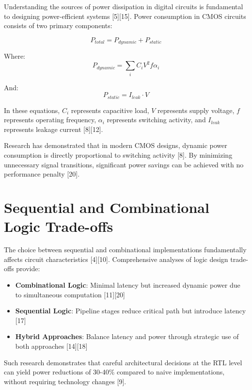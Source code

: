\documentclass[15pt,a4paper]{report}
\begin{document}
Understanding the sources of power dissipation in digital circuits is fundamental to designing power-efficient systems [5][15]. Power consumption in CMOS circuits consists of two primary components:

\begin{equation}
P_{total} = P_{dynamic} + P_{static}
\end{equation}

Where:
\begin{equation}
P_{dynamic} = \sum_{i} C_i V^2 f \alpha_i
\end{equation}

And:
\begin{equation}
P_{static} = I_{leak} \cdot V
\end{equation}

In these equations, $C_i$ represents capacitive load, $V$ represents supply voltage, $f$ represents operating frequency, $\alpha_i$ represents switching activity, and $I_{leak}$ represents leakage current [8][12].

Research has demonstrated that in modern CMOS designs, dynamic power consumption is directly proportional to switching activity [8]. By minimizing unnecessary signal transitions, significant power savings can be achieved with no performance penalty [20].

\section{Sequential and Combinational Logic Trade-offs}

The choice between sequential and combinational implementations fundamentally affects circuit characteristics [4][10]. Comprehensive analyses of logic design trade-offs provide:

\begin{itemize}
    \item \textbf{Combinational Logic}: Minimal latency but increased dynamic power due to simultaneous computation [11][20]
    \item \textbf{Sequential Logic}: Pipeline stages reduce critical path but introduce latency [17]
    \item \textbf{Hybrid Approaches}: Balance latency and power through strategic use of both approaches [14][18]
\end{itemize}

Such research demonstrates that careful architectural decisions at the RTL level can yield power reductions of 30-40\% compared to naive implementations, without requiring technology changes [9].
\end{document}
